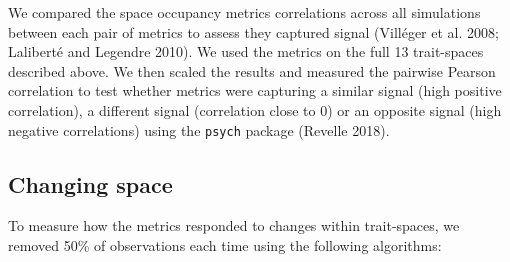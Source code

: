 \documentclass[]{article}
\begin{document}
We compared the space occupancy metrics correlations across all
simulations between each pair of metrics to assess they captured signal
(Villéger et al. 2008; Laliberté and Legendre 2010). We used the metrics
on the full 13 trait-spaces described above. We then scaled the results
and measured the pairwise Pearson correlation to test whether metrics
were capturing a similar signal (high positive correlation), a different
signal (correlation close to 0) or an opposite signal (high negative
correlations) using the \texttt{psych} package (Revelle 2018).

\subsection{Changing space}\label{changing-spaces}

To measure how the metrics responded to changes within trait-spaces, we
removed 50\% of observations each time using the following algorithms:
\end{document}

